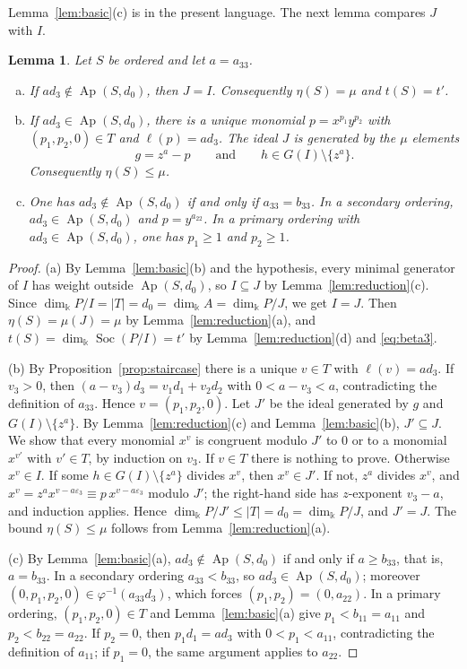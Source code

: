 \documentclass{amsart}
\newtheorem{lemma}[theorem]{Lemma}
\theoremstyle{definition}
\theoremstyle{remark}
\numberwithin{equation}{section}
\newcommand{\kk}{\Bbbk}
\newcommand{\Ap}{\operatorname{Ap}}
\DeclareMathOperator{\Soc}{Soc}
\newcommand{\wt}{\ell}
\newcommand{\Apd}{\Ap(S,d_0)}
\begin{document}
Lemma~\ref{lem:basic}(c) is \cite[Lemma~4.3]{Cho26} in the present language. The next lemma compares $J$ with $I$.

\begin{lemma}\label{lem:J}
Let $S$ be ordered and let $a=a_{33}$.
\begin{enumerate}[(a)]
\item If $ad_3\notin\Apd$, then $J=I$. Consequently $\eta(S)=\mu$ and $t(S)=t'$.
\item If $ad_3\in\Apd$, there is a unique monomial $p=x^{p_1}y^{p_2}$ with $(p_1,p_2,0)\in T$ and $\wt(p)=ad_3$. The ideal $J$ is generated by the $\mu$ elements
\[
g=z^a-p\qquad\text{and}\qquad h\in G(I)\setminus\{z^a\}.
\]
Consequently $\eta(S)\le\mu$.
\item One has $ad_3\notin\Apd$ if and only if $a_{33}=b_{33}$. In a secondary ordering, $ad_3\in\Apd$ and $p=y^{a_{22}}$. In a primary ordering with $ad_3\in\Apd$, one has $p_1\ge1$ and $p_2\ge1$.
\end{enumerate}
\end{lemma}

\begin{proof}
(a) By Lemma~\ref{lem:basic}(b) and the hypothesis, every minimal generator of $I$ has weight outside $\Apd$, so $I\subseteq J$ by Lemma~\ref{lem:reduction}(c). Since $\dim_\kk P/I=|T|=d_0=\dim_\kk A=\dim_\kk P/J$, we get $I=J$. Then $\eta(S)=\mu(J)=\mu$ by Lemma~\ref{lem:reduction}(a), and $t(S)=\dim_\kk\Soc(P/I)=t'$ by Lemma~\ref{lem:reduction}(d) and \eqref{eq:beta3}.

(b) By Proposition~\ref{prop:staircase} there is a unique $v\in T$ with $\wt(v)=ad_3$. If $v_3>0$, then $(a-v_3)d_3=v_1d_1+v_2d_2$ with $0<a-v_3<a$, contradicting the definition of $a_{33}$. Hence $v=(p_1,p_2,0)$. Let $J'$ be the ideal generated by $g$ and $G(I)\setminus\{z^a\}$. By Lemma~\ref{lem:reduction}(c) and Lemma~\ref{lem:basic}(b), $J'\subseteq J$. We show that every monomial $x^v$ is congruent modulo $J'$ to $0$ or to a monomial $x^{v'}$ with $v'\in T$, by induction on $v_3$. If $v\in T$ there is nothing to prove. Otherwise $x^v\in I$. If some $h\in G(I)\setminus\{z^a\}$ divides $x^v$, then $x^v\in J'$. If not, $z^a$ divides $x^v$, and $x^v=z^ax^{v-a\varepsilon_3}\equiv p\,x^{v-a\varepsilon_3}$ modulo $J'$; the right-hand side has $z$-exponent $v_3-a$, and induction applies. Hence $\dim_\kk P/J'\le|T|=d_0=\dim_\kk P/J$, and $J'=J$. The bound $\eta(S)\le\mu$ follows from Lemma~\ref{lem:reduction}(a).

(c) By Lemma~\ref{lem:basic}(a), $ad_3\notin\Apd$ if and only if $a\ge b_{33}$, that is, $a=b_{33}$. In a secondary ordering $a_{33}<b_{33}$, so $ad_3\in\Apd$; moreover $(0,p_1,p_2,0)\in\varphi^{-1}(a_{33}d_3)$, which forces $(p_1,p_2)=(0,a_{22})$. In a primary ordering, $(p_1,p_2,0)\in T$ and Lemma~\ref{lem:basic}(a) give $p_1<b_{11}=a_{11}$ and $p_2<b_{22}=a_{22}$. If $p_2=0$, then $p_1d_1=ad_3$ with $0<p_1<a_{11}$, contradicting the definition of $a_{11}$; if $p_1=0$, the same argument applies to $a_{22}$.
\end{proof}
\end{document}

